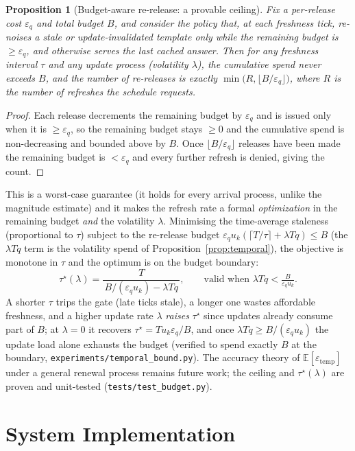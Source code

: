 \documentclass[sigconf,nonacm]{acmart}
\newcommand{\eps}{\varepsilon}
\newcommand{\E}{\mathbb{E}}
\newtheorem{prop}{Proposition}
\begin{document}
\begin{prop}[Budget-aware re-release: a provable ceiling]
\label{prop:barr}
Fix a per-release cost $\eps_q$ and total budget $B$, and consider the policy that, at each freshness tick, re-noises a stale or update-invalidated template only while the remaining budget is $\ge\eps_q$, and otherwise serves the last cached answer. Then for \emph{any} freshness interval $\tau$ and \emph{any} update process (volatility $\lambda$), the cumulative spend never exceeds $B$, and the number of re-releases is exactly $\min\!\bigl(R,\lfloor B/\eps_q\rfloor\bigr)$, where $R$ is the number of refreshes the schedule requests.
\end{prop}
\begin{proof}
Each release decrements the remaining budget by $\eps_q$ and is issued only when it is $\ge\eps_q$, so the remaining budget stays $\ge0$ and the cumulative spend is non-decreasing and bounded above by $B$. Once $\lfloor B/\eps_q\rfloor$ releases have been made the remaining budget is $<\eps_q$ and every further refresh is denied, giving the count.
\end{proof}

\noindent This is a worst-case guarantee (it holds for every arrival process, unlike the magnitude estimate) and it makes the refresh rate a formal \emph{optimization} in the remaining budget \emph{and} the volatility $\lambda$. Minimising the time-average staleness (proportional to $\tau$) subject to the re-release budget $\eps_q u_k(\lceil T/\tau\rceil+\lambda Tq)\le B$ (the $\lambda Tq$ term is the volatility spend of Proposition~\ref{prop:temporal}), the objective is monotone in $\tau$ and the optimum is on the budget boundary:
\[
\tau^\star(\lambda)=\frac{T}{\,B/(\eps_q u_k)-\lambda Tq\,},\qquad\text{valid when }\lambda Tq<\tfrac{B}{\eps_q u_k}.
\]
A shorter $\tau$ trips the gate (late ticks stale), a longer one wastes affordable freshness, and a higher update rate $\lambda$ \emph{raises} $\tau^\star$ since updates already consume part of $B$; at $\lambda{=}0$ it recovers $\tau^\star=T u_k\eps_q/B$, and once $\lambda Tq\ge B/(\eps_q u_k)$ the update load alone exhausts the budget (verified to spend exactly $B$ at the boundary, \texttt{experiments/temporal\_bound.py}). The accuracy theory of $\E[\eps_{\mathrm{temp}}]$ under a general renewal process remains future work; the ceiling and $\tau^\star(\lambda)$ are proven and unit-tested (\texttt{tests/test\_budget.py}).

\section{System Implementation}
\label{sec:system}
\end{document}
